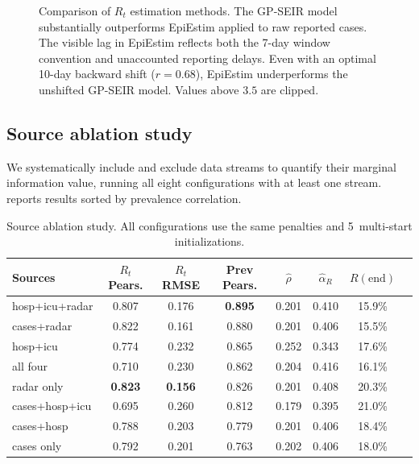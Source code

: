 \documentclass[11pt]{article}
\begin{document}
\begin{figure}[ht]
\centering
{}
\caption{Comparison of $R_t$ estimation methods. The GP-SEIR model substantially outperforms EpiEstim applied to raw reported cases. The visible lag in EpiEstim reflects both the 7-day window convention and unaccounted reporting delays. Even with an optimal 10-day backward shift ($r=0.68$), EpiEstim underperforms the unshifted GP-SEIR model. Values above $3.5$ are clipped.}\label{fig:epiestim}
\end{figure}

\subsection{Source ablation study}\label{sec:results:ablation}

We systematically include and exclude data streams to quantify their marginal information value, running all eight configurations with at least one stream.  reports results sorted by prevalence correlation.

\begin{table}[ht]
\centering\small
\caption{Source ablation study. All configurations use the same penalties and 5~multi-start initializations.}
\label{tab:ablation}
\begin{tabular}{lccccccc}
\toprule
Sources & $R_t$ Pears. & $R_t$ RMSE & Prev Pears. & $\hat\rho$ & $\hat\alpha_R$ & $R(\text{end})$ \\
\midrule
hosp+icu+radar    & 0.807 & 0.176 & \textbf{0.895} & 0.201 & 0.410 & 15.9\% \\
cases+radar       & 0.822 & 0.161 & 0.880 & 0.201 & 0.406 & 15.5\% \\
hosp+icu          & 0.774 & 0.232 & 0.865 & 0.252 & 0.343 & 17.6\% \\
all four          & 0.710 & 0.230 & 0.862 & 0.204 & 0.416 & 16.1\% \\
radar only        & \textbf{0.823} & \textbf{0.156} & 0.826 & 0.201 & 0.408 & 20.3\% \\
cases+hosp+icu    & 0.695 & 0.260 & 0.812 & 0.179 & 0.395 & 21.0\% \\
cases+hosp        & 0.788 & 0.203 & 0.779 & 0.201 & 0.406 & 18.4\% \\
cases only        & 0.792 & 0.201 & 0.763 & 0.202 & 0.406 & 18.0\% \\
\bottomrule
\end{tabular}
\end{table}
\end{document}

